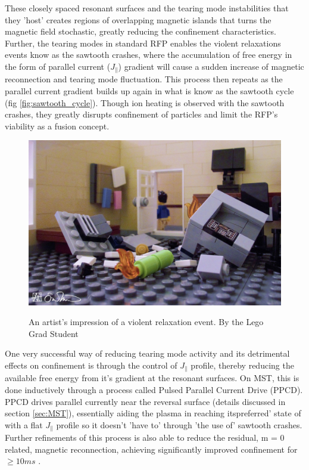 \begin{refsection}
These closely spaced resonant surfaces and the tearing mode instabilities that
they 'host' creates regions of overlapping magnetic islands that turns the
magnetic field stochastic, greatly reducing the confinement characteristics.
Further, the tearing modes in standard RFP enables the violent relaxations
events know as the sawtooth crashes, where the accumulation of free energy in
the form of parallel current ($J_{\parallel}$) gradient will cause a sudden
increase of magnetic reconnection and tearing mode fluctuation. This process
then repeats as the parallel current gradient builds up again in what is know
as the sawtooth cycle (fig \ref{fig:sawtooth_cycle}). Though ion heating is
observed with the sawtooth
crashes\cite{Bodin1980Reversed-field-pinchReserarch}, they greatly disrupts
confinement of particles and limit the RFP's viability as a fusion concept.

\begin{figure}[!htb]
	\centering
	\includegraphics[width = .8\linewidth]{./1_Introduction/violent_relaxation.jpg}
	\label{fig:violet_relaxation}
	\caption[An illustration of violent relaxation]{An artist's impression of a violent relaxation event. By the Lego Grad Student}
\end{figure}%

One very successful way of reducing tearing mode activity and its detrimental
effects on confinement is through the control of $J_{\parallel}$ profile,
thereby reducing the available free energy from it's gradient at the resonant
surfaces\cite{Sarff1995TransportPinch}. On MST, this is done inductively
through a process called Pulsed Parallel Current Drive (PPCD). PPCD drives
parallel currently near the reversal surface (details discussed in section
\ref{sec:MST}), essentially aiding the plasma in reaching itspreferred' state
of with a flat $J_{\parallel}$ profile so it doesn't 'have to' through 'the use
of' sawtooth crashes. Further refinements of this process is also able to
reduce the residual, m = 0 related, magnetic reconnection, achieving
significantly improved confinement for $\geq 10ms$ \cite{Chapman2001}.




\end{refsection}
